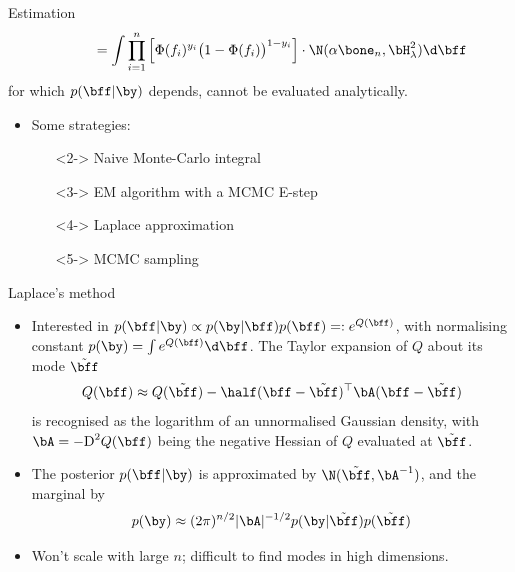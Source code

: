 \begin{frame}{Estimation}
{  \[
    \phantom{p(\by)} = \int \prod_{i=1}^n \left[ \Phi(f_i)^{y_i} \big(1 - \Phi(f_i)\big)^{1-y_i} \right] \cdot \N(\alpha\bone_n, \bH_\lambda^2) \d\bff
  \]
  \hspace{0.65cm} for which $p(\bff|\by)$ depends, cannot be evaluated analytically.}
  \vspace{3pt}
  \begin{itemize}
    \item<2-> Some strategies:
    \begin{itemize}
      \item[\xmark]<2-> Naive Monte-Carlo integral
      \item[\xmark]<3-> EM algorithm with a MCMC E-step
      \item[{\color{FUorange}\cmark}]<4-> Laplace approximation
      \item[{\color{FUorange}\cmark}]<5-> MCMC sampling
    \end{itemize}
  \end{itemize}
\end{frame}


\begin{frame}{Laplace's method}
  \vspace{-15pt}
  \begin{itemize}\setlength\itemsep{0.8em}
    \item Interested in $p(\bff|\by) \propto p(\by|\bff)p(\bff) =: e^{Q(\bff)}$, with normalising constant $p(\by) = \int e^{Q(\bff)} \d\bff$. The Taylor expansion of $Q$ about its mode $\tilde\bff$
    \[
      Q(\bff) \approx Q(\tilde\bff) - \half (\bff - \tilde\bff)^\top\bA(\bff - \tilde\bff) 
    \]
    is recognised as the logarithm of an unnormalised Gaussian density, with $\bA = -\text{D}^2 Q(\bff)$ being the negative Hessian of $Q$ evaluated at  $\tilde\bff$.
    \item The posterior $p(\bff|\by)$ is approximated by $\N(\tilde\bff, \bA^{-1})$, and the marginal by
    \[
      p(\by) \approx (2\pi)^{n/2} \vert \bA \vert^{-1/2}  p(\by|\tilde\bff)p(\tilde\bff)
    \]
    \item Won't scale with large $n$; difficult to find modes in high dimensions.
  \end{itemize}
\end{frame}

